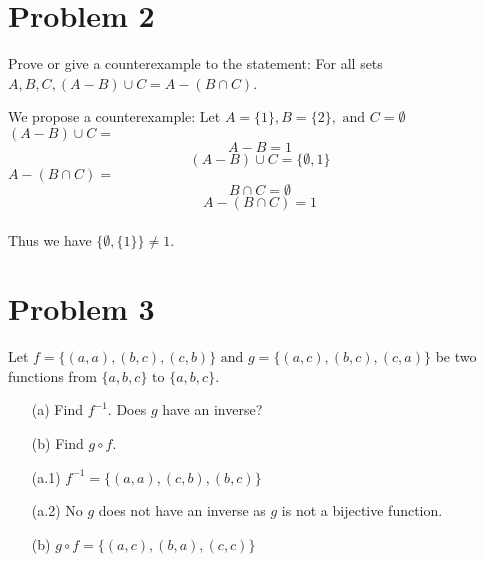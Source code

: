 \documentclass[12pt]{article}
\begin{document}
\section*{Problem 2}

\begin{tcolorbox}[colback=gray!10, colframe=black, title=Given]
	Prove or give a counterexample to the statement: For all sets \( A, B, C, (A - B) \cup C = A - (B \cap C) \).
\end{tcolorbox}

\begin{tcolorbox}[colback=yellow!20, colframe=black, title=Solution]
	We propose a counterexample:
	Let \( A = \{1\}, B = \{2\}, \text{ and } C = \emptyset \)
	\\
	\( (A - B) \cup C = \)
	\[ A - B = 1 \]
	\[ (A - B) \cup C = \{\emptyset, {1} \} \]
	\( A - (B \cap C) = \)
	\[ B \cap C = \emptyset \]
	\[ A - (B \cap C) = 1 \]
	\\Thus we have \( \{\emptyset, \{1\}\} \neq 1 \).
\end{tcolorbox}
\section*{Problem 3}

\begin{tcolorbox}[colback=gray!10, colframe=black, title=Given]
	Let \( f=\{(a,a), (b,c), (c,b)\} \text{ and } g=\{(a,c), (b,c), (c,a)\}\) be two functions from \( \{a,b,c\} \text{ to } \{a,b,c\} \).
	\begin{enumerate}
		\item [(a)] Find \( f^{-1} \). Does $g$ have an inverse?
		\item [(b)] Find \( g \circ f \).
	\end{enumerate}
\end{tcolorbox}

\begin{tcolorbox}[colback=yellow!20, colframe=black, title=Solution]
	\begin{enumerate}
		\item [(a.1)] \( f^{-1} = \{(a,a), (c,b), (b,c)\}\)
		\item [(a.2)] No $g$ does not have an inverse as $g$ is not a bijective function.
		\item [(b)] \( g \circ f = \{(a,c), (b,a), (c,c) \} \)
	\end{enumerate}
\end{tcolorbox}
\end{document}

